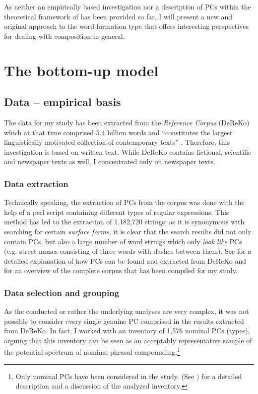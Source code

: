 \documentclass[output=paper]{LSP/langsci}
\begin{document}
As neither an empirically based investigation nor a description of PCs within the theoretical framework of  has been provided so far, I will present a new and original approach to the word-formation type that offers interesting perspectives for dealing with composition in general. 


\section{The bottom-up model}\label{sec:hein:2}
\subsection{Data -- empirical basis}\label{sec:hein:2.1}
The data for my study has been extracted from the \textit{ Reference Corpus} (DeReKo) \citep{IDS2011a} which at that time comprised 5.4 billion words and ``constitutes the largest linguistically motivated collection of contemporary  texts” \citep[2]{CLPA}. Therefore, this investigation is based on written text. While DeReKo contains fictional, scientific and newspaper texts as well, I concentrated only on newspaper texts.

\subsubsection{Data extraction}\label{sec:hein:2.1.1}
Technically speaking, the extraction of PCs from the corpus was done with the help of a perl script containing different types of regular expressions. This method has led to the extraction of 1,182,720 strings; as it is synonymous with searching for certain \textit{surface forms}, it is clear that the search results did not only contain PCs, but also a large number of word strings which only \textit{look like} PCs (e.g. street names consisting of three words with dashes between them). See \citet[Chapter~III.1]{Hein2015} for a detailed explanation of how PCs can be found and extracted from DeReKo and for an overview of the complete corpus that has been compiled for my study.

\subsubsection{Data selection and grouping}\label{sec:hein:2.1.2}
As the conducted  or rather the underlying analyses are very complex, it was not possible to consider every single genuine PC comprised in the results extracted from DeReKo. In fact, I worked with an inventory of 1,576 nominal PCs (types), arguing that this inventory can be seen as an acceptably representative sample of the potential spectrum of nominal phrasal compounding.\footnote{Only nominal PCs have been considered in the study. (See \citealp[Chapter~III.2]{Hein2015}) for a detailed description and a discussion of the analyzed inventory.}
\end{document}
